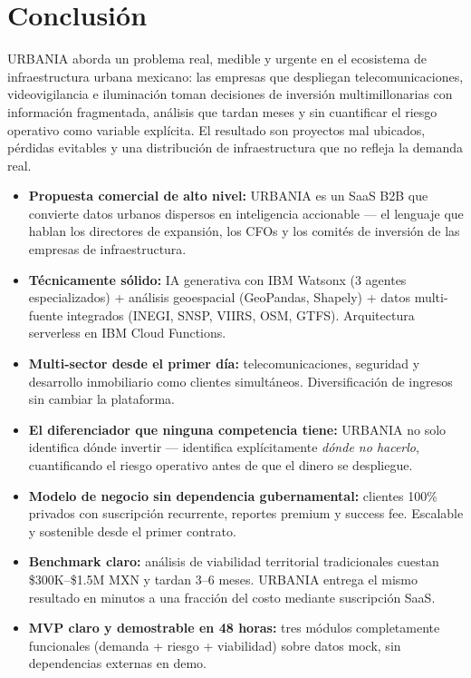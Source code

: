 \documentclass[12pt,a4paper]{article}
\begin{document}
\newpage
\section{Conclusión}

URBANIA aborda un problema real, medible y urgente en el ecosistema de infraestructura urbana mexicano: las empresas que despliegan telecomunicaciones, videovigilancia e iluminación toman decisiones de inversión multimillonarias con información fragmentada, análisis que tardan meses y sin cuantificar el riesgo operativo como variable explícita. El resultado son proyectos mal ubicados, pérdidas evitables y una distribución de infraestructura que no refleja la demanda real.

\begin{tcolorbox}[cajaprincipal, title=¿Por qué URBANIA gana?]
\begin{itemize}[leftmargin=0.5cm, itemsep=4pt]
  \item \textbf{Propuesta comercial de alto nivel:} URBANIA es un SaaS B2B que convierte datos urbanos dispersos en inteligencia accionable — el lenguaje que hablan los directores de expansión, los CFOs y los comités de inversión de las empresas de infraestructura.
  \item \textbf{Técnicamente sólido:} IA generativa con IBM Watsonx (3 agentes especializados) + análisis geoespacial (GeoPandas, Shapely) + datos multi-fuente integrados (INEGI, SNSP, VIIRS, OSM, GTFS). Arquitectura serverless en IBM Cloud Functions.
  \item \textbf{Multi-sector desde el primer día:} telecomunicaciones, seguridad y desarrollo inmobiliario como clientes simultáneos. Diversificación de ingresos sin cambiar la plataforma.
  \item \textbf{El diferenciador que ninguna competencia tiene:} URBANIA no solo identifica dónde invertir — identifica explícitamente \textit{dónde no hacerlo}, cuantificando el riesgo operativo antes de que el dinero se despliegue.
  \item \textbf{Modelo de negocio sin dependencia gubernamental:} clientes 100\% privados con suscripción recurrente, reportes premium y success fee. Escalable y sostenible desde el primer contrato.
  \item \textbf{Benchmark claro:} análisis de viabilidad territorial tradicionales cuestan \$300K–\$1.5M MXN y tardan 3–6 meses. URBANIA entrega el mismo resultado en minutos a una fracción del costo mediante suscripción SaaS.
  \item \textbf{MVP claro y demostrable en 48 horas:} tres módulos completamente funcionales (demanda + riesgo + viabilidad) sobre datos mock, sin dependencias externas en demo.
\end{itemize}
\end{tcolorbox}
\end{document}
